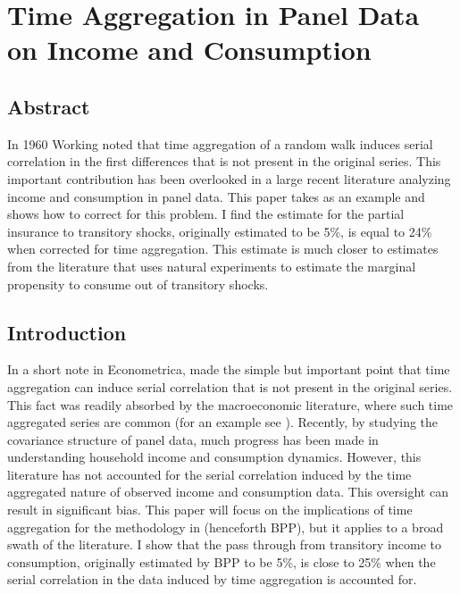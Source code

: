 \chapter{Time Aggregation in Panel Data on Income and Consumption}

\section{Abstract}
In 1960 Working noted that time aggregation of a random walk induces serial correlation in the first differences that is not present in the original series. This important contribution has been overlooked in a large recent literature analyzing income and consumption in panel data. This paper takes \cite{blundell_consumption_2008} as an example and shows how to correct for this problem. I find the estimate for the partial insurance to transitory shocks, originally estimated to be 5\%, is equal to 24\% when corrected for time aggregation. This estimate is much closer to estimates from the literature that uses natural experiments to estimate the marginal propensity to consume out of transitory shocks.

\section{Introduction}
In a short note in Econometrica, \cite{working_note_1960} made the simple but important point that time aggregation can induce serial correlation that is not present in the original series. This fact was readily absorbed by the macroeconomic literature, where such time aggregated series are common (for an example see \cite{campbell_consumption_1989}). Recently, by studying the covariance structure of panel data, much progress has been made in understanding household income and consumption dynamics. However, this literature has not accounted for the serial correlation induced by the time aggregated nature of observed income and consumption data. This oversight can result in significant bias. This paper will focus on the implications of time aggregation for the methodology in \cite{blundell_consumption_2008} (henceforth BPP), but it applies to a broad swath of the literature. I show that the pass through from transitory income to consumption, originally estimated by BPP to be 5\%, is close to 25\% when the serial correlation in the data induced by time aggregation is accounted for.

